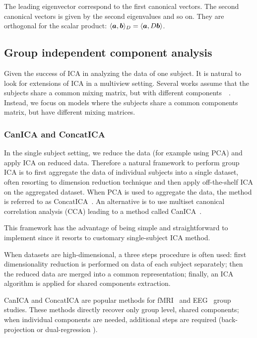     The leading eigenvector correspond to the first canonical vectors. The
    second canonical vectors is given by the second eigenvalues and so on. They
    are orthogonal for the scalar product: $\langle{ \boldsymbol{a}},{ \boldsymbol{b}  }\rangle_D =
    \langle{ \boldsymbol{a}},{ D \boldsymbol{b}  }\rangle$.

  
\subsection{Group independent component analysis}
\label{sec:groupica}
Given the success of ICA in analyzing the data of one subject. It is natural to
look for extensions of ICA in a multiview setting.
Several works assume that the subjects share a common mixing matrix, but with different components~\cite{pfister2019robustifying}~\cite{svensen2002ica}.
% 
Instead, we focus on models where the subjects share a common components matrix, but have different mixing matrices.

\subsubsection{CanICA and ConcatICA}
\label{sec:canicaandconcatica}
In the single subject setting, we reduce the data (for example using PCA) and apply ICA on
reduced data. Therefore a natural framework to perform group ICA is to first aggregate the
data of individual subjects into a single dataset, often resorting to dimension
reduction technique and then apply off-the-shelf ICA on the aggregated dataset.
When PCA is used to aggregate the data, the method is referred to as
ConcatICA~\cite{calhoun2001method}. An alternative is to use multiset canonical
correlation analysis (CCA) leading to a method called CanICA~\cite{varoquaux2009canica}.

This framework has the advantage of being simple and
straightforward to implement since it resorts to customary single-subject
ICA method.

When datasets are high-dimensional, a three steps procedure is often used: first
dimensionality reduction is performed on data of each subject  separately; then
the reduced data are merged into a common representation; finally, an ICA
algorithm is applied for shared components extraction.

CanICA and ConcatICA are popular methods for fMRI~\cite{calhoun2009review} and EEG~\cite{eichele2011eegift} group studies. These methods directly recover only group level, shared components; when individual components are needed, additional steps are required (back-projection \cite{calhoun2001method} or dual-regression \cite{beckmann2009group}).
% 

